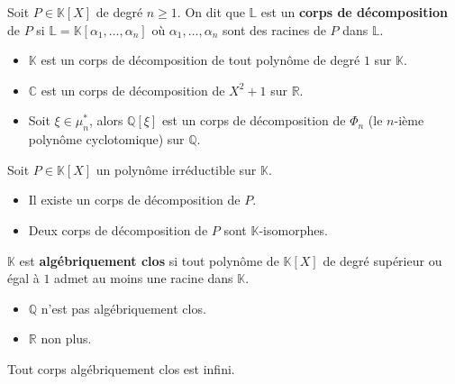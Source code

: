 	\begin{definition}
		Soit $P \in \mathbb{K}[X]$ de degré $n \geq 1$. On dit que $\mathbb{L}$ est un \textbf{corps de décomposition} de $P$ si $\mathbb{L} = \mathbb{K}[\alpha_1, \dots, \alpha_n]$ où $\alpha_1, \dots, \alpha_n$ sont des racines de $P$ dans $\mathbb{L}$.
	\end{definition}
	
	\begin{example}
		\begin{itemize}
			\item $\mathbb{K}$ est un corps de décomposition de tout polynôme de degré $1$ sur $\mathbb{K}$.
			\item $\mathbb{C}$ est un corps de décomposition de $X^2+1$ sur $\mathbb{R}$.
			\item Soit $\xi \in \mu_n^*$, alors $\mathbb{Q}[\xi]$ est un corps de décomposition de $\Phi_n$ (le $n$-ième polynôme cyclotomique) sur $\mathbb{Q}$.
		\end{itemize}
	\end{example}
	
	\begin{theorem}
		Soit $P \in \mathbb{K}[X]$ un polynôme irréductible sur $\mathbb{K}$.
		\begin{itemize}
			\item Il existe un corps de décomposition de $P$.
			\item Deux corps de décomposition de $P$ sont $\mathbb{K}$-isomorphes.
		\end{itemize}
	\end{theorem}
	
	\begin{definition}
		$\mathbb{K}$ est \textbf{algébriquement clos} si tout polynôme de $\mathbb{K}[X]$ de degré supérieur ou égal à $1$ admet au moins une racine dans $\mathbb{K}$.
	\end{definition}
	
	\begin{example}
		\begin{itemize}
			\item $\mathbb{Q}$ n'est pas algébriquement clos.
			\item $\mathbb{R}$ non plus.
		\end{itemize}
	\end{example}
	
	\begin{proposition}
		Tout corps algébriquement clos est infini.
	\end{proposition}
	

